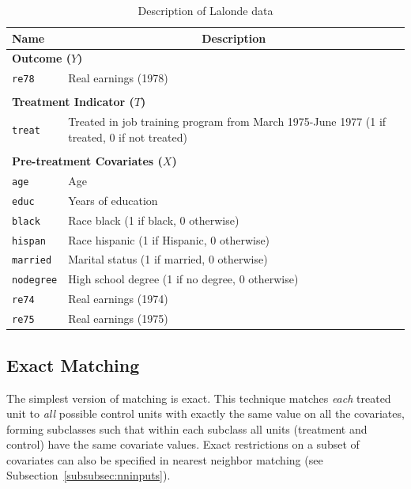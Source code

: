 \documentclass[oneside,letterpaper,titlepage]{article}
\begin{document}
\begin{table}[h]
\centering
\begin{tabular}{lp{3in}}
  \hline 
  \multicolumn{1}{l}{Name} & \multicolumn{1}{c}{Description} \\
  \hline
  \multicolumn{2}{l}{\textbf{Outcome ($Y$)}} \\ 
  \texttt{re78} & Real earnings (1978) \\\\
  \multicolumn{2}{l}{\textbf{Treatment Indicator ($T$)}} \\
  \texttt{treat} & Treated in job training program from March 1975-June
  1977 (1 if treated, 0 if not treated)
  \\ \\
  \multicolumn{2}{l}{\textbf{Pre-treatment Covariates ($X$)}} \\
  \texttt{age} & Age\\
  \texttt{educ} & Years of education \\
  \texttt{black} & Race black (1 if black, 0 otherwise) \\
  \texttt{hispan} & Race hispanic  (1 if Hispanic, 0 otherwise) \\
  \texttt{married} & Marital status (1 if married, 0 otherwise) \\
  \texttt{nodegree} & High school degree (1 if no degree, 0 otherwise)\\
  \texttt{re74} & Real earnings (1974) \\
  \texttt{re75} & Real earnings (1975) \\ 
  \hline
\end{tabular}\label{lalonde}
\caption{Description of Lalonde data \label{dwvars}}
\end{table}

\subsection{Exact Matching}\label{exactm}

The simplest version of matching is exact.  This technique matches
\emph{each} treated unit to \emph{all} possible control units with
exactly the same value on all the covariates, forming subclasses such
that within each subclass all units (treatment and control) have the
same covariate values.  Exact restrictions on a subset of covariates
can also be specified in nearest neighbor matching (see
Subsection~\ref{subsubsec:nninputs}).
\end{document}
